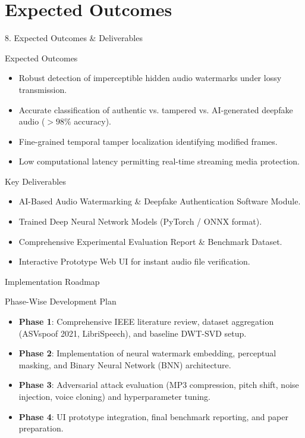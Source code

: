 \documentclass[10pt, aspectratio=169]{beamer}
\begin{document}
\section{Expected Outcomes}
\begin{frame}{8. Expected Outcomes \& Deliverables}
  \begin{block}{Expected Outcomes}
    \begin{itemize}
      \item Robust detection of imperceptible hidden audio watermarks under lossy transmission.
      \item Accurate classification of authentic vs. tampered vs. AI-generated deepfake audio ($>98\%$ accuracy).
      \item Fine-grained temporal tamper localization identifying modified frames.
      \item Low computational latency permitting real-time streaming media protection.
    \end{itemize}
  \end{block}

  \begin{block}{Key Deliverables}
    \begin{itemize}
      \item AI-Based Audio Watermarking \& Deepfake Authentication Software Module.
      \item Trained Deep Neural Network Models (PyTorch / ONNX format).
      \item Comprehensive Experimental Evaluation Report \& Benchmark Dataset.
      \item Interactive Prototype Web UI for instant audio file verification.
    \end{itemize}
  \end{block}
\end{frame}

\begin{frame}{Implementation Roadmap}
  \begin{block}{Phase-Wise Development Plan}
    \begin{itemize}
      \item \textbf{Phase 1}: Comprehensive IEEE literature review, dataset aggregation (ASVspoof 2021, LibriSpeech), and baseline DWT-SVD setup.
      \item \textbf{Phase 2}: Implementation of neural watermark embedding, perceptual masking, and Binary Neural Network (BNN) architecture.
      \item \textbf{Phase 3}: Adversarial attack evaluation (MP3 compression, pitch shift, noise injection, voice cloning) and hyperparameter tuning.
      \item \textbf{Phase 4}: UI prototype integration, final benchmark reporting, and paper preparation.
    \end{itemize}
  \end{block}
\end{frame}
\end{document}
